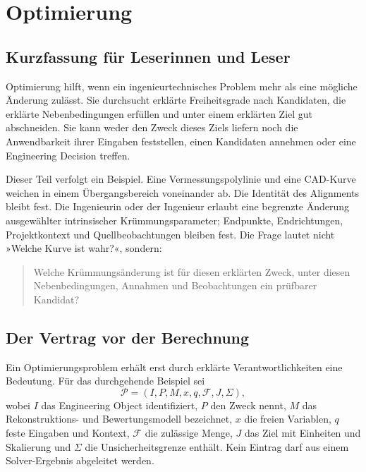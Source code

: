 \chapter*{Optimierung}
{}

\section*{Kurzfassung für Leserinnen und Leser}

Optimierung hilft, wenn ein ingenieurtechnisches Problem mehr als eine
mögliche Änderung zulässt. Sie durchsucht erklärte Freiheitsgrade nach
Kandidaten, die erklärte Nebenbedingungen erfüllen und unter einem erklärten
Ziel gut abschneiden. Sie kann weder den Zweck dieses Ziels liefern noch die
Anwendbarkeit ihrer Eingaben feststellen, einen Kandidaten annehmen oder eine
Engineering Decision treffen.

Dieser Teil verfolgt ein Beispiel. Eine Vermessungspolylinie und eine
CAD-Kurve weichen in einem Übergangsbereich voneinander ab. Die Identität des
Alignments bleibt fest. Die Ingenieurin oder der Ingenieur erlaubt eine
begrenzte Änderung ausgewählter intrinsischer Krümmungsparameter; Endpunkte,
Endrichtungen, Projektkontext und Quellbeobachtungen bleiben fest. Die Frage
lautet nicht »Welche Kurve ist wahr?«, sondern:
\begin{quote}
Welche Krümmungsänderung ist für diesen erklärten Zweck, unter diesen
Nebenbedingungen, Annahmen und Beobachtungen ein prüfbarer Kandidat?
\end{quote}

\section*{Der Vertrag vor der Berechnung}

Ein Optimierungsproblem erhält erst durch erklärte Verantwortlichkeiten eine
Bedeutung. Für das durchgehende Beispiel sei
\[
\mathcal P=(I,P,M,x,q,\mathcal F,J,\Sigma),
\]
wobei \(I\) das Engineering Object identifiziert, \(P\) den Zweck nennt,
\(M\) das Rekonstruktions- und Bewertungsmodell bezeichnet, \(x\) die freien
Variablen, \(q\) feste Eingaben und Kontext, \(\mathcal F\) die zulässige
Menge, \(J\) das Ziel mit Einheiten und Skalierung und \(\Sigma\) die
Unsicherheitsgrenze enthält. Kein Eintrag darf aus einem Solver-Ergebnis
abgeleitet werden.

